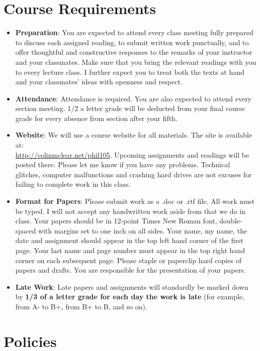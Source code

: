 \documentclass[12pt]{article}
\begin{document}
  \section*{Course Requirements}
  \begin{itemize}
  \item \textbf{Preparation}: You are expected to attend every class meeting fully prepared to discuss each assigned reading, to submit written work punctually, and to offer thoughtful and constructive responses to the remarks of your instructor and your classmates. Make sure that you bring the relevant readings with you to every lecture class. I further expect you to treat both the texts at hand and your classmates’ ideas with openness and respect. 
  \item \textbf{Attendance}: Attendance is required. You are also expected to attend every section meeting. 1/2 a letter grade will be deducted from your final course grade for every absence from section after your fifth. 
  \item \textbf{Website}: We will use a course website for all materials.
    The site is available at:\\
    \href{http://colinmclear.net/phil105}{http://colinmclear.net/phil105}. Upcoming assignments and readings will be posted there. Please let me know if you have any problems. Technical glitches, computer malfunctions and crashing hard drives are not excuses for failing to complete work in this class.
  \item \textbf{Format for Papers}: Please submit work as a .doc or .rtf file. All work must be typed. I will not accept any handwritten work aside from that we do in class. Your papers should be in 12-point Times New Roman font, double-spaced with margins set to one inch on all sides. Your name, my name, the date and assignment should appear in the top left hand corner of the first page. Your last name and page number must appear in the top right hand corner on each subsequent page. Please staple or paperclip hard copies of papers and drafts. You are responsible for the presentation of your papers.
  \item \textbf{Late Work}: Late papers and assignments will standardly be marked down by \textbf{1/3 of a letter grade for each day the work is late} (for example, from A- to B+, from B+ to B, and so on).
  \end{itemize}


  \section*{Policies}
\end{document}
